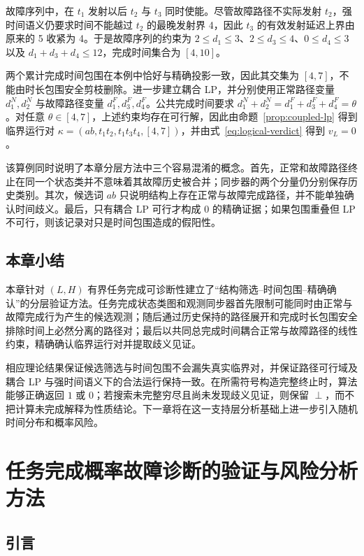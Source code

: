 \documentclass[master,fontset=ubuntu]{shnuthesis}
\DeclareRobustCommand{\logicstatus}[1]{\ensuremath{#1}}
\theoremstyle{definition}
\begin{document}
故障序列中，在 \(t_1\) 发射以后 \(t_2\) 与 \(t_3\) 同时使能。尽管故障路径不实际发射 \(t_2\)，强时间语义仍要求时间不能越过 \(t_2\) 的最晚发射界 4，因此 \(t_3\) 的有效发射延迟上界由原来的 5 收紧为 4。于是故障序列的约束为 \(2\leq d_1\leq3\)、\(2\leq d_3\leq4\)、\(0\leq d_4\leq3\) 以及 \(d_1+d_3+d_4\leq12\)，完成时间集合为 \([4,10]\)。

两个累计完成时间包围在本例中恰好与精确投影一致，因此其交集为 \([4,7]\)，不能由时长包围安全剪枝删除。进一步建立耦合 LP，并分别使用正常路径变量 \(d_1^N,d_2^N\) 与故障路径变量 \(d_1^F,d_3^F,d_4^F\)。公共完成时间要求 \(d_1^N+d_2^N=d_1^F+d_3^F+d_4^F=\theta\)。对任意 \(\theta\in[4,7]\)，上述约束均存在可行解，因此由命题~\ref{prop:coupled-lp} 得到临界运行对 \(\kappa=(ab,t_1t_2,t_1t_3t_4,[4,7])\)，并由式~\eqref{eq:logical-verdict} 得到 \(v_L=0\)。

该算例同时说明了本章分层方法中三个容易混淆的概念。首先，正常和故障路径终止在同一个状态类并不意味着其故障历史被合并；同步器的两个分量仍分别保存历史类别。其次，候选词 \(ab\) 只说明结构上存在正常与故障完成路径，并不能单独确认时间歧义。最后，只有耦合 LP 可行才构成 \logicstatus{0} 的精确证据；如果包围重叠但 LP 不可行，则该记录对只是时间包围造成的假阳性。

\section{本章小结}

本章针对 \((L,H)\) 有界任务完成可诊断性建立了“结构筛选--时间包围--精确确认”的分层验证方法。任务完成状态类图和观测同步器首先限制可能同时由正常与故障完成行为产生的候选观测；随后通过历史保持的路径展开和完成时长包围安全排除时间上必然分离的路径对；最后以共同总完成时间耦合正常与故障路径的线性约束，精确确认临界运行对并提取歧义见证。

相应理论结果保证候选筛选与时间包围不会漏失真实临界对，并保证路径可行域及耦合 LP 与强时间语义下的合法运行保持一致。在所需符号构造完整终止时，算法能够正确返回 \logicstatus{1} 或 \logicstatus{0}；若搜索未完整穷尽且尚未发现歧义见证，则保留 \logicstatus{\perp}，而不把计算未完成解释为性质结论。下一章将在这一支持层分析基础上进一步引入随机时间分布和概率风险。

\chapter{任务完成概率故障诊断的验证与风险分析方法}

\section{引言}
\end{document}
